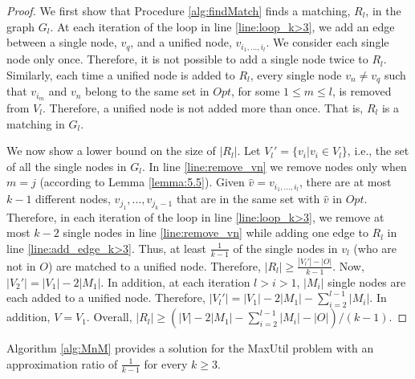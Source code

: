 \documentclass[sigconf,anonymous]{aamas}
\begin{document}
\begin{proof}
We first show that Procedure \ref{alg:findMatch} finds a matching, $R_l$, in the graph $G_l$.
At each iteration of the loop in line \ref{line:loop_k>3}, we add an edge between a single node, $v_q$, and a unified node, $v_{i_1,...,i_l}$.
We consider each single node only once. Therefore, it is not possible to add a single node twice to $R_l$. Similarly, each time a unified node is added to $R_l$, every single node $v_n \neq v_q$ such that $v_{i_m}$ and $v_n$ belong to the same set in $Opt$, for some $1\leq m\leq l$, is removed from $V_l$. Therefore, a unified node is not added more than once. That is, $R_l$ is a matching in $G_l$.

We now show a lower bound on the size of $|R_l|$.
Let $V_l'=\{v_i | v_i \in V_l\}$, i.e., the set of all the single nodes in $G_l$.
In line \ref{line:remove_vn} we remove nodes only when $m=j$ (according to Lemma \ref{lemma:5.5}).
Given $\hat{v} = v_{i_1,...,i_l}$, there are at most $k-1$ different nodes, $v_{j_1},...,v_{j_k-1}$ that are in the same set with $\hat{v}$ in $Opt$. Therefore, in each iteration of the loop in line \ref{line:loop_k>3}, we remove at most $k-2$ single nodes in line \ref{line:remove_vn} while adding one edge to $R_l$ in line \ref{line:add_edge_k>3}.
Thus, at least $\frac{1}{k-1}$ of the single nodes in $v_l$ (who are not in $O$) are matched to a unified node. Therefore, $|R_l| \geq \frac{|V_l'|-|O|}{k-1}$.
Now, $|V_2'|=|V_1|-2|M_1|$. In addition, at each iteration $l>i>1$, $|M_i|$ single nodes are each added to a unified node. Therefore, $|V_l'|=|V_1|-2|M_1|-\sum\limits_{i=2}^{l-1}|M_i|$. 
In addition, $V=V_1$.
Overall, $|R_l| \geq (|V|-2|M_1|-\sum\limits_{i=2}^{l-1}|M_i|-|O|)/(k-1)$.
\end{proof}


\begin{theorem}
Algorithm \ref{alg:MnM} provides a solution for the MaxUtil problem with an approximation ratio of $\frac{1}{k-1}$ for every $k\geq 3$.
\end{theorem}
\end{document}
